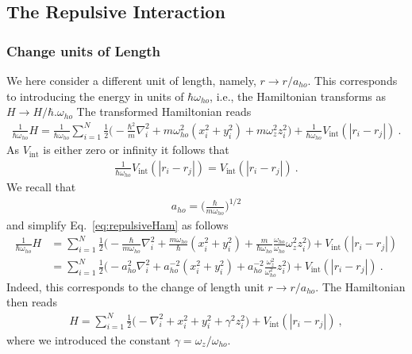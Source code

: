 \documentclass[11pt,a4paper]{article}
\numberwithin{equation}{section}
\begin{document}
\subsection{The Repulsive Interaction}
\subsubsection{Change units of Length}
%
We here consider a different unit of length, namely, $r\to r/a_{ho}$.
%
This corresponds to introducing the energy in units of $\hbar \omega_{ho}$, i.e., the Hamiltonian transforms as $H\to H/\hbar. \omega_{ho}$
%
The transformed Hamiltonian reads
\begin{align}
\label{eq:repulsiveHam}
\frac{1}{\hbar \omega_{ho}}H
=
\frac{1}{\hbar \omega_{ho}}\sum_{i=1}^{N}\frac{1}{2}\bigg(
-\frac{\hbar^2}{m}\nabla_i^2+m\omega_{ho}^2(x_i^2+y_i^2)+m\omega_z^2z_i^2
\bigg)
+
\frac{1}{\hbar \omega_{ho}}V_{\mathrm{int}}(|r_i-r_j|)~.
\end{align} 
As $V_{\mathrm{int}}$ is either zero or infinity it follows that 
\begin{align*}
\frac{1}{\hbar \omega_{ho}}V_{\mathrm{int}}(|r_i-r_j|) = V_{\mathrm{int}}(|r_i-r_j|)~.
\end{align*}
We recall that 
\begin{align*}
a_{ho} = \bigg(\frac{\hbar}{m\omega_{ho}}\bigg)^{1/2}
\end{align*}
and simplify Eq.~\eqref{eq:repulsiveHam} as follows
\begin{align*}
\frac{1}{\hbar \omega_{ho}}H
&=
\sum_{i=1}^{N}\frac{1}{2}\bigg(
-\frac{\hbar}{m\omega_{ho}}\nabla_i^2+\frac{m\omega_{ho}}{\hbar}(x_i^2+y_i^2)+\frac{m}{\hbar \omega_{ho}}\frac{\omega_{ho}}{ \omega_{ho}}\omega_z^2z_i^2
\bigg)
+
V_{\mathrm{int}}(|r_i-r_j|)\\
&=
\sum_{i=1}^{N}\frac{1}{2}\bigg(
-a_{ho}^2\nabla_i^2+a_{ho}^{-2}(x_i^2+y_i^2)+a_{ho}^{-2}\frac{\omega_z^2}{\omega_{ho}^2}z_i^2
\bigg)
+
V_{\mathrm{int}}(|r_i-r_j|)~.
\end{align*} 
Indeed, this corresponds to the change of length unit $r\to r/a_{ho}$.
%
The Hamiltonian then reads
\begin{align*}
H
=
\sum_{i=1}^{N}\frac{1}{2}\bigg(
-\nabla_i^2+x_i^2+y_i^2+\gamma^2 z_i^2
\bigg)
+
V_{\mathrm{int}}(|r_i-r_j|)~,
\end{align*} 
where we introduced the constant $\gamma = \omega_z/\omega_{ho}$.





\end{document}
